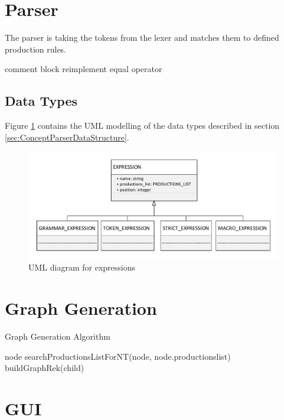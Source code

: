 \section{Parser}\label{sec:ImplementationParser}

The parser is taking the tokens from the lexer and matches them to defined production rules.

comment block reimplement equal operator

\subsection{Data Types}\label{sec:ImplementationDataTypes}
Figure \ref{fig:ImplementationUMLExpressions} contains the UML modelling of the data types described in section \ref{sec:ConceptParserDataStructure}.
\begin{figure}[H]
\centering
\includegraphics[width=1\textwidth]{images/uml_data_types_expressions.pdf}
\caption{UML diagram for expressions}
\label{fig:ImplementationUMLExpressions}
\end{figure}
\section{Graph Generation}\label{sec:ImplementationGraphGeneration}

\begin{algorithm}[H]
\caption{Graph Generation Algorithm}
\begin{algorithmic}[1] 
\Require node
\State searchProductionsListForNT(node, node.productionslist)
		\State buildGraphRek(child)
	\EndFor
\EndIf
\end{algorithmic}
\end{algorithm}

\section{GUI}\label{sec:GUI}

